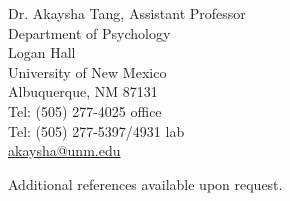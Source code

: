 \documentclass[10pt, overlapped, line]{res}
\begin{document}
\begin{resume}
\begin{multicols}{2}
{   Dr. Akaysha Tang, Assistant Professor\\
   Department of Psychology \\
   Logan Hall \\
   University of New Mexico \\
   Albuquerque, NM 87131 \\
   Tel: (505) 277-4025 office \\
   Tel: (505) 277-5397/4931 lab \\
   \href{URL}{akaysha@unm.edu} \\
}
\end{multicols}

Additional references available upon request.



\end{resume}
\end{document}
